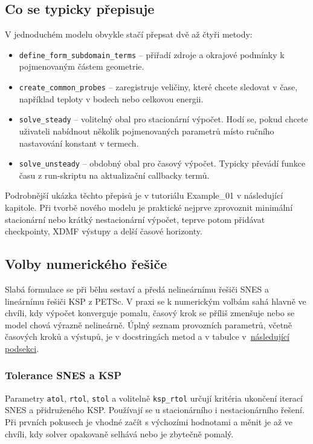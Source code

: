\documentclass[a4paper,11pt]{article}
\begin{document}
\subsection*{Co se typicky přepisuje}

V jednoduchém modelu obvykle stačí přepsat dvě až čtyři metody:

\begin{itemize}
  \item \texttt{define\_form\_subdomain\_terms} -- přiřadí zdroje a okrajové
        podmínky k pojmenovaným částem geometrie.
  \item \texttt{create\_common\_probes} -- zaregistruje veličiny, které chcete
        sledovat v čase, například teploty v bodech nebo celkovou energii.
  \item \texttt{solve\_steady} -- volitelný obal pro stacionární výpočet. Hodí
        se, pokud chcete uživateli nabídnout několik pojmenovaných parametrů
        místo ručního nastavování konstant v termech.
  \item \texttt{solve\_unsteady} -- obdobný obal pro časový výpočet. Typicky
        převádí funkce času z run-skriptu na aktualizační callbacky termů.
\end{itemize}

Podrobnější ukázka těchto přepisů je v tutoriálu Example\_01 v následující
kapitole. Při tvorbě nového modelu je praktické nejprve zprovoznit minimální
stacionární nebo krátký nestacionární výpočet, teprve potom přidávat checkpointy,
XDMF výstupy a delší časové horizonty.

\subsection*{Volby numerického řešiče}

Slabá formulace se při běhu sestaví a předá nelineárnímu řešiči SNES a
lineárnímu řešiči KSP z PETSc. V praxi se k numerickým volbám sahá hlavně ve
chvíli, kdy výpočet konverguje pomalu, časový krok se příliš zmenšuje nebo se
model chová výrazně nelineárně. Úplný seznam provozních parametrů, včetně
časových kroků a výstupů, je v docstringách metod a v tabulce
v~\hyperref[pars:solve-unsteady]{následující podsekci}.

\subsubsection*{Tolerance SNES a KSP}
Parametry \texttt{atol}, \texttt{rtol}, \texttt{stol} a volitelně
\texttt{ksp\_rtol} určují kritéria ukončení iterací SNES a přidruženého KSP.
Používají se u stacionárního i nestacionárního řešení. Při prvních pokusech je
vhodné začít s výchozími hodnotami a měnit je až ve chvíli, kdy solver opakovaně
selhává nebo je zbytečně pomalý.
\end{document}
